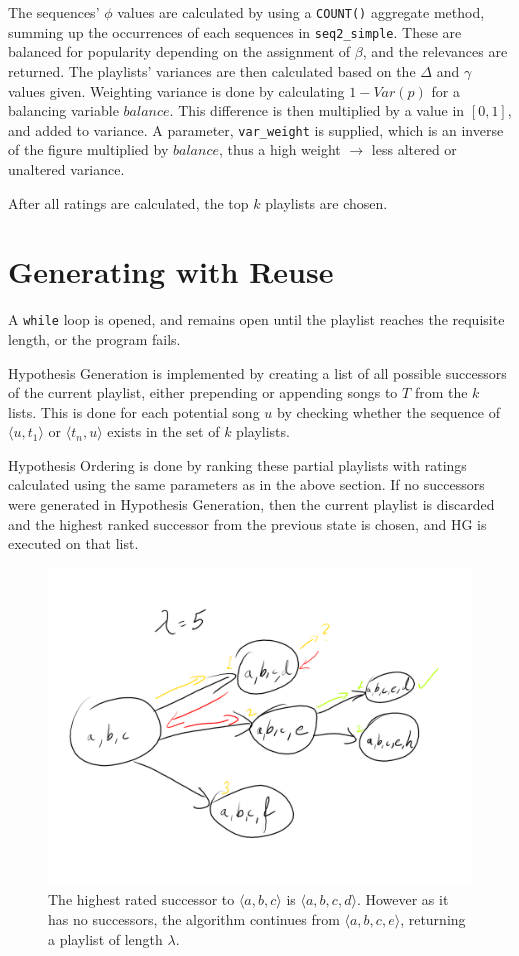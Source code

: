 \documentclass[a4paper, 12pt]{report}
\begin{document}
The sequences' \(\phi\) values are calculated by using a \texttt{COUNT()} aggregate method, summing up the occurrences of each sequences in \texttt{seq2\_simple}.
These are balanced for popularity depending on the assignment of \(\beta\), and the relevances are returned.
The playlists' variances are then calculated based on the \(\Delta\) and \(\gamma\) values given.
Weighting variance is done by calculating \(1 - Var(p)\) for a balancing variable \(balance\). This difference is then multiplied by a value in \([0,1]\), and added to variance.
A parameter, \texttt{var\_weight} is supplied, which is an inverse of the figure multiplied by \(balance\), thus a high weight \(\rightarrow\) less altered or unaltered variance.

After all ratings are calculated, the top \(k\) playlists are chosen.

\section{Generating with Reuse}
A \texttt{while} loop is opened, and remains open until the playlist reaches the requisite length, or the program fails.

Hypothesis Generation is implemented by creating a list of all possible successors of the current playlist, either prepending or appending songs to \(T\) from the \(k\) lists.
This is done for each potential song \(u\) by checking whether the sequence of \(\langle u, t_1\rangle\) or \(\langle t_n, u\rangle\) exists in the set of \(k\) playlists.

Hypothesis Ordering is done by ranking these partial playlists with ratings calculated using the same parameters as in the above section.
If no successors were generated in Hypothesis Generation, then the current playlist is discarded and the highest ranked successor from the previous state is chosen,
and HG is executed on that list.

\begin{figure}[H]
    \centering
    \includegraphics[width=\textwidth]{nodes.png}
    \caption{The highest rated successor to \(\langle a,b,c\rangle\) is \(\langle a,b,c,d\rangle\).
    However as it has no successors, the algorithm continues from \(\langle a,b,c,e\rangle\), returning a playlist of length \(\lambda\).}
\end{figure}
\end{document}
